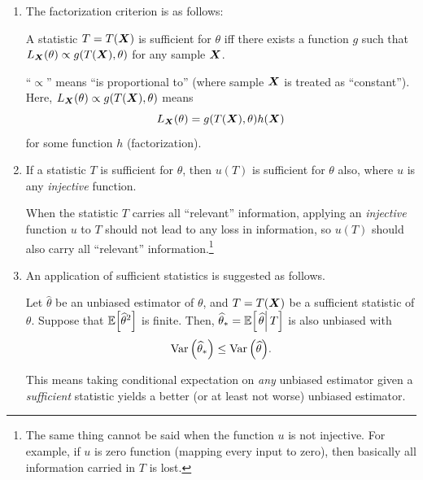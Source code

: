 \begin{enumerate}
\item The factorization criterion is as follows:
\begin{theorem}
\label{thm:fact-criterion}
A statistic \(T=T(\vb*{X})\) is sufficient for \(\theta\) iff there exists a
function \(g\) such that \(L_{\vb*{X}}\qty(\theta)\propto g(T(\vb*{X}),
\theta)\) for any sample \(\vb*{X}\).
\end{theorem}
\begin{note}
``\(\propto\)'' means ``is proportional to'' (where sample \(\vb*{X}\)
is treated as ``constant''). Here, \(L_{\vb*{X}}\qty(\theta)\propto
g(T(\vb*{X}), \theta)\) means
\[
L_{\vb*{X}}\qty(\theta)=g(T(\vb*{X}), \theta)h(\vb*{X})
\]
for some function \(h\) (factorization).
\end{note}

\item If a statistic \(T\) is sufficient for \(\theta\), then \(u(T)\) is
sufficient for \(\theta\) also, where \(u\) is any \emph{injective} function.

\begin{intuition}
When the statistic \(T\) carries all ``relevant'' information, applying an
\emph{injective} function \(u\) to \(T\) should not lead to any loss in
information, so \(u(T)\) should also carry all ``relevant''
information.\footnote{The same thing cannot be said when the function \(u\) is
not injective. For example, if \(u\) is zero function (mapping every input to
zero), then basically all information carried in \(T\) is lost.}
\end{intuition}

\item An application of sufficient statistics is suggested as follows.
\begin{theorem}
\label{thm:rao-blackwell}
Let \(\widehat{\theta}\) be an unbiased estimator of \(\theta\), and
\(T=T(\vb*{X})\) be a sufficient statistic of \(\theta\). Suppose that
\(\mathbb{E}\qty[\widehat{\theta}^{2}]\) is finite. Then,
\(\widehat{\theta}_*=\mathbb{E}\qty[\left.\widehat{\theta}\right|T]\) is also unbiased
with
\[
\operatorname{Var}\qty(\widehat{\theta}_*)\le \operatorname{Var}\qty(\widehat{\theta}).
\]
\end{theorem}
\begin{note}
This means taking conditional expectation on \emph{any} unbiased estimator
given a \emph{sufficient} statistic yields a better (or at least not worse)
unbiased estimator.
\end{note}
\end{enumerate}
